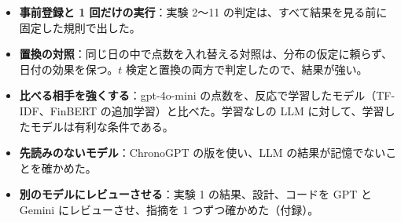 \begin{itemize}
\item \textbf{事前登録と 1 回だけの実行}：実験 2〜11 の判定は、すべて結果を見る前に固定した規則で出した。
\item \textbf{置換の対照}：同じ日の中で点数を入れ替える対照は、分布の仮定に頼らず、日付の効果を保つ。$t$ 検定と置換の両方で判定したので、結果が強い。
\item \textbf{比べる相手を強くする}：gpt-4o-mini の点数を、反応で学習したモデル（TF-IDF、FinBERT の追加学習）と比べた。学習なしの LLM に対して、学習したモデルは有利な条件である。
\item \textbf{先読みのないモデル}：ChronoGPT の版を使い、LLM の結果が記憶でないことを確かめた。
\item \textbf{別のモデルにレビューさせる}：実験 1 の結果、設計、コードを GPT と Gemini にレビューさせ、指摘を 1 つずつ確かめた（付録）。
\end{itemize}
